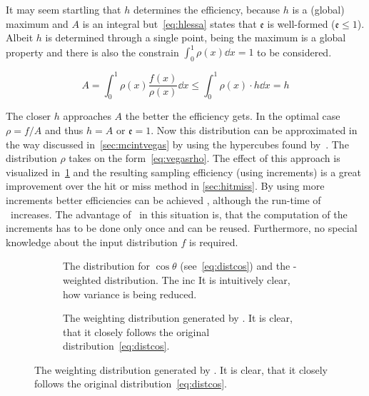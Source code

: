 It may seem startling that \(h\) determines the efficiency, because
\(h\) is a (global) maximum and \(A\) is an integral
but~\eqref{eq:hlessa} states that \(\mathfrak{e}\) is well-formed
(\(\mathfrak{e}\leq 1\)). Albeit \(h\) is determined through a single
point, being the maximum is a global property and there is also the
constrain \(\int_0^1\rho(x)\dd{x}=1\) to be considered.

\begin{equation}
  \label{eq:hlessa}
  A = \int_0^1\rho(x)\frac{f(x)}{\rho(x)}\dd{x} \leq
  \int_0^1\rho(x)\cdot h\dd{x} = h
\end{equation}


The closer \(h\) approaches \(A\) the better the efficiency gets. In
the optimal case \(\rho=f/A\) and thus \(h=A\) or
\(\mathfrak{e} = 1\). Now this distribution can be approximated in the
way discussed in~\ref{sec:mcintvegas} by using the hypercubes found
by~\vegas. The distribution \(\rho\) takes on the
form~\eqref{eq:vegasrho}. The effect of this approach is visualized
in~\ref{fig:vegasdist} and the resulting sampling efficiency
 (using
 increments) is a great
improvement over the hit or miss method in \ref{sec:hitmiss}. By using
more increments better efficiencies can be achieved , although the
run-time of \vegas\ increases. The advantage of \vegas\ in this
situation is, that the computation of the increments has to be done
only once and can be reused. Furthermore, no special knowledge about
the input distribution \(f\) is required.


\begin{figure}[ht]
  \centering
  \begin{subfigure}{.49\textwidth}
    \caption[The distribution for \(\cos\theta\), derived from the
    differential cross-section and the \vegas-weighted
    distribution]{\label{fig:vegasdist} The distribution for
      \(\cos\theta\) (see~\eqref{eq:distcos}) and the \vegas-weighted
      distribution. The inc It is intuitively clear, how variance is
      being reduced.}
  \end{subfigure}
  \begin{subfigure}{.49\textwidth}
    \caption[The weighting distribution generated by
    \vegas.]{\label{fig:vegasrho} The weighting distribution generated by
    \vegas. It is clear, that it closely follows the original
    distribution~\eqref{eq:distcos}.}
  \end{subfigure}
\end{figure}
